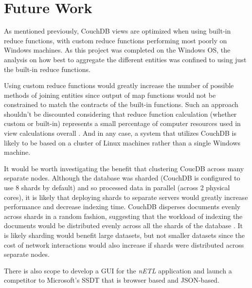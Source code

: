 \section{Future Work}
As mentioned previously, CouchDB views are optimized when using built-in reduce functions, with custom reduce functions performing most poorly on Windows machines. As this project was completed on the Windows OS, the analysis on how best to aggregate the different entities was confined to using just the built-in reduce functions.

Using custom reduce functions would greatly increase the number of possible methods of joining entities since output of map functions would not be constrained to match the contracts of the built-in functions. Such an approach shouldn't be discounted considering that reduce function calculation (whether custom or built-in) represents a small percentage of computer resources used in view calculations overall \cite{slack1Nov}. And in any case, a system that utilizes CouchDB is likely to be based on a cluster of Linux machines rather than a single Windows machine.

It would be worth investigating the benefit that clustering CoucDB across many separate nodes. Although the database was sharded (CouchDB is configured to use 8 shards by default) and so processed data in parallel (across 2 physical cores), it is likely that deploying shards to separate servers would greatly increase performance and decrease indexing time. CouchDB disperses documents evenly across shards in a random fashion, suggesting that the workload of indexing the documents would be distributed evenly across all the shards of the database \cite{slack7Nov}. It is likely sharding would benefit large datasets, but not smaller datasets since the cost of network interactions would also increase if shards were distributed across separate nodes.

There is also scope to develop a GUI for the \textit{nETL} application and launch a competitor to Microsoft's SSDT that is browser based and JSON-based.